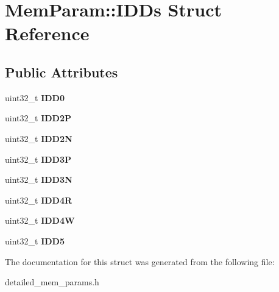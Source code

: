 \hypertarget{structMemParam_1_1IDDs}{\section{Mem\-Param\-:\-:I\-D\-Ds Struct Reference}
\label{structMemParam_1_1IDDs}
}
\subsection*{Public Attributes}
\begin{DoxyCompactItemize}
\item 
\hypertarget{structMemParam_1_1IDDs_a8fcfe9e934164ff83e346230f169dabf}{uint32\-\_\-t {\bfseries I\-D\-D0}}\label{structMemParam_1_1IDDs_a8fcfe9e934164ff83e346230f169dabf}

\item 
\hypertarget{structMemParam_1_1IDDs_a4b7c8f54fa62e4aff3e19b75bf6de6c4}{uint32\-\_\-t {\bfseries I\-D\-D2\-P}}\label{structMemParam_1_1IDDs_a4b7c8f54fa62e4aff3e19b75bf6de6c4}

\item 
\hypertarget{structMemParam_1_1IDDs_ac9edff647fcc8a29e5dff344f666f882}{uint32\-\_\-t {\bfseries I\-D\-D2\-N}}\label{structMemParam_1_1IDDs_ac9edff647fcc8a29e5dff344f666f882}

\item 
\hypertarget{structMemParam_1_1IDDs_a82d176b52f517b4454717022f2eb90cf}{uint32\-\_\-t {\bfseries I\-D\-D3\-P}}\label{structMemParam_1_1IDDs_a82d176b52f517b4454717022f2eb90cf}

\item 
\hypertarget{structMemParam_1_1IDDs_aa3070fa8a506b2c430330c7cc64d86ae}{uint32\-\_\-t {\bfseries I\-D\-D3\-N}}\label{structMemParam_1_1IDDs_aa3070fa8a506b2c430330c7cc64d86ae}

\item 
\hypertarget{structMemParam_1_1IDDs_a3f407bf4130cb9cd19debd2c211c6c2c}{uint32\-\_\-t {\bfseries I\-D\-D4\-R}}\label{structMemParam_1_1IDDs_a3f407bf4130cb9cd19debd2c211c6c2c}

\item 
\hypertarget{structMemParam_1_1IDDs_af5352db154c1e132d9f2f9d9f667d2a6}{uint32\-\_\-t {\bfseries I\-D\-D4\-W}}\label{structMemParam_1_1IDDs_af5352db154c1e132d9f2f9d9f667d2a6}

\item 
\hypertarget{structMemParam_1_1IDDs_afcbefd971416f3bf373fe52f392f8eee}{uint32\-\_\-t {\bfseries I\-D\-D5}}\label{structMemParam_1_1IDDs_afcbefd971416f3bf373fe52f392f8eee}

\end{DoxyCompactItemize}


The documentation for this struct was generated from the following file\-:\begin{DoxyCompactItemize}
\item 
detailed\-\_\-mem\-\_\-params.\-h\end{DoxyCompactItemize}
